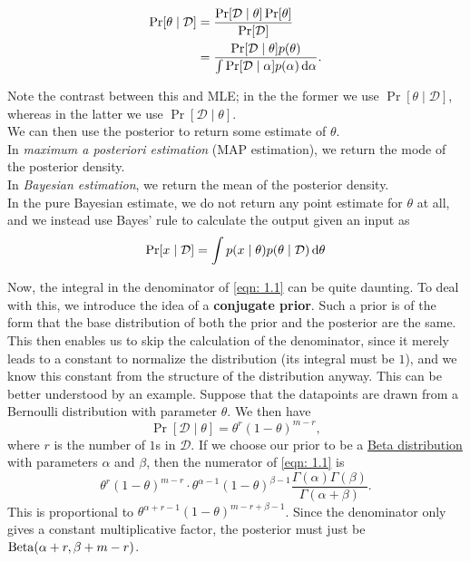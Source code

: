 \documentclass{article}
\begin{document}
			\begin{align}
				\Pr[\theta\mid\mathcal{D}] &= \frac{\Pr[\mathcal{D}\mid\theta] \Pr[\theta]}{\Pr[\mathcal{D}]} \nonumber \\
					&= \frac{\Pr[\mathcal{D}\mid\theta] p(\theta)}{\int \Pr[\mathcal{D}\mid\alpha] p(\alpha) \dif \alpha}. \label{eqn: 1.1}
			\end{align}

			Note the contrast between this and MLE; in the the former we use $\Pr[\theta\mid\mathcal{D}]$, whereas in the latter we use $\Pr[\mathcal{D}\mid\theta]$.\\
			We can then use the posterior to return some estimate of $\theta$.\\
			In \emph{maximum a posteriori estimation} (MAP estimation), we return the mode of the posterior density.\\
			In \emph{Bayesian estimation}, we return the mean of the posterior density.\\
			In the pure Bayesian estimate, we do not return any point estimate for $\theta$ at all, and we instead use Bayes' rule to calculate the output given an input as
			\[ \Pr[x \mid \mathcal{D}] = \int p(x\mid\theta) p(\theta\mid\mathcal{D}) \dif \theta \]

			Now, the integral in the denominator of \eqref{eqn: 1.1} can be quite daunting. To deal with this, we introduce the idea of a \textbf{conjugate prior}. Such a prior is of the form that the base distribution of both the prior and the posterior are the same. This then enables us to skip the calculation of the denominator, since it merely leads to a constant to normalize the distribution (its integral must be $1$), and we know this constant from the structure of the distribution anyway. This can be better understood by an example. Suppose that the datapoints are drawn from a Bernoulli distribution with parameter $\theta$. We then have
			\[ \Pr[\mathcal{D} \mid \theta] = \theta^r (1-\theta)^{m-r}, \]
			where $r$ is the number of $1$s in $\mathcal{D}$. If we choose our prior to be a \href{https://en.wikipedia.org/wiki/Beta_distribution}{Beta distribution} with parameters $\alpha$ and $\beta$, then the numerator of \eqref{eqn: 1.1} is
			\[ \theta^r (1-\theta)^{m-r} \cdot \theta^{\alpha-1} (1-\theta)^{\beta-1} \frac{\Gamma(\alpha)\Gamma(\beta)}{\Gamma(\alpha+\beta)}. \]
			This is proportional to $\theta^{\alpha+r-1}(1-\theta)^{m-r+\beta-1}$. Since the denominator only gives a constant multiplicative factor, the posterior must just be $\operatorname{Beta}(\alpha+r,\beta+m-r)$.\\
\end{document}
